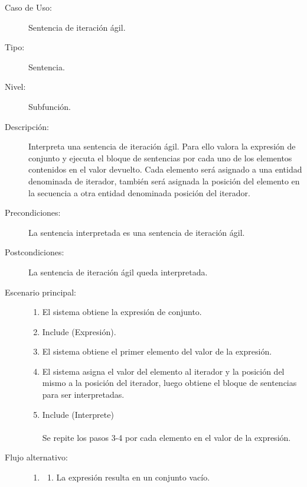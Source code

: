 \begin{framed}
\FloatBarrier
\begin{description}
   \item[Caso de Uso:]  Sentencia de iteración ágil.
   \item [Tipo:] Sentencia.
   \item[Nivel:]  Subfunción.
   \item[Descripción:] 
   Interpreta una sentencia de iteración ágil. Para ello valora la expresión de conjunto
   y ejecuta el bloque de sentencias por cada uno de los elementos contenidos en el valor devuelto.
   Cada elemento será asignado a una entidad denominada de iterador, también será asignada 
   la posición del elemento en la secuencia a otra entidad denominada posición del iterador. 
   \item[Precondiciones:] 
   La sentencia interpretada es una sentencia de iteración ágil.
   \item[Postcondiciones:] 
   La sentencia de iteración ágil queda interpretada.   
   \item[Escenario principal:] \hfill
   \begin{enumerate}
   \item El sistema obtiene la expresión de conjunto.
   \item Include (Expresión).
   \item El sistema obtiene el primer elemento del valor de la expresión.
   \item El sistema asigna el valor del elemento al iterador y la posición del mismo a la posición del iterador, 
   luego obtiene el bloque de sentencias para ser interpretadas.
   \item Include (Interprete) \\\\ \hfill
   Se repite los pasos 3-4 por cada elemento en el valor de la expresión.
   \end{enumerate}
   \item[Flujo alternativo:] \hfill 
   \begin{enumerate} \itemsep1pt \parskip0pt 
   \setcounter{enumi}{2}
   \renewcommand{\labelenumi}{}
   \renewcommand{\labelenumiii}{\arabic{enumiii}.}
   \renewcommand{\labelenumii}{\arabic{enumi}\alph{enumii}.}
      \item 
      \begin {enumerate}
         \setcounter{enumii}{0}
         \item La expresión resulta en un conjunto vacío.
         \begin{enumerate}

\end{enumerate}
\end{enumerate}
\end{enumerate}
\end{description}
\end{framed}
